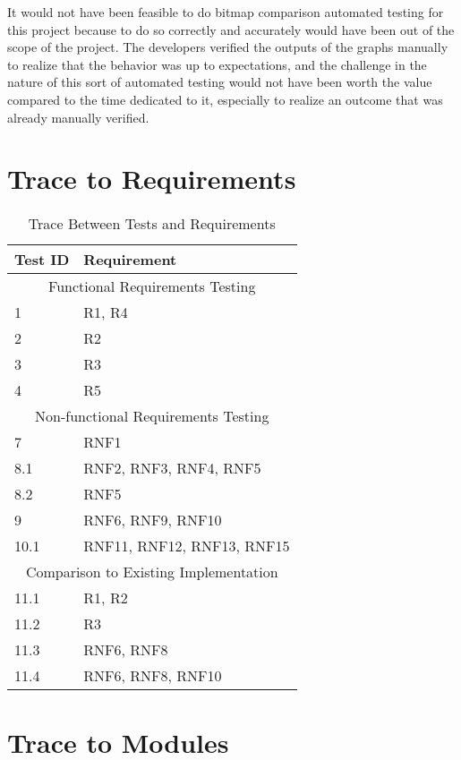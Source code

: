 \documentclass[12pt, titlepage]{article}
\begin{document}
It would not have been feasible to do bitmap comparison automated testing for this project because to do so correctly and accurately would have been out of the scope of the project. The developers verified the outputs of the graphs manually to realize that the behavior was up to expectations, and the challenge in the nature of this sort of automated testing would not have been worth the value compared to the time dedicated to it, especially to realize an outcome that was already manually verified.



\section{Trace to Requirements} %

\begin{table}[H!]
\centering
\begin{tabular}{p{} p{}}
\toprule
\textbf{Test ID} & \textbf{Requirement}\\
\midrule
\multicolumn{2}{c}{Functional Requirements Testing} \\
\midrule
1 & R1, R4 \\
2 & R2 \\
3 & R3 \\
4 & R5 \\

\midrule
\multicolumn{2}{c}{Non-functional Requirements Testing} \\
\midrule

7 & RNF1\\
8.1 & RNF2, RNF3, RNF4, RNF5\\
8.2 & RNF5\\
9 &  RNF6, RNF9, RNF10\\
10.1 & RNF11, RNF12, RNF13, RNF15\\
\midrule
\multicolumn{2}{c}{Comparison to Existing Implementation} \\
\midrule
11.1 & R1, R2\\
11.2 & R3\\
11.3 & RNF6, RNF8\\
11.4 & RNF6, RNF8, RNF10\\
\bottomrule
\end{tabular}
\caption{Trace Between Tests and Requirements}
\end{table}
		
\section{Trace to Modules} %
\end{document}

